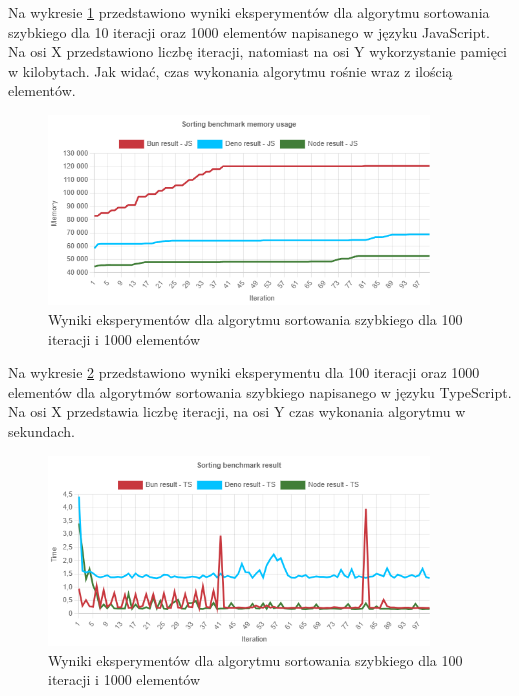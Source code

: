 Na wykresie \ref{fig:quick_sorting_e2_memory_js} przedstawiono wyniki eksperymentów dla algorytmu sortowania szybkiego dla 10 iteracji oraz 1000 elementów napisanego w języku JavaScript. Na osi X przedstawiono liczbę iteracji, natomiast na osi Y wykorzystanie pamięci w kilobytach. Jak widać, czas wykonania algorytmu rośnie wraz z ilością elementów.
\begin{figure}[H]
  \centering
  \includegraphics[width=0.9\textwidth]{Figures/sorting/quick/e2_memory_js.png}
  \caption{Wyniki eksperymentów dla algorytmu sortowania szybkiego dla 100 iteracji i 1000 elementów}
  \label{fig:quick_sorting_e2_memory_js}
\end{figure}

Na wykresie \ref{fig:quick_sorting_e2_ts} przedstawiono wyniki eksperymentu dla 100 iteracji oraz 1000 elementów dla algorytmów sortowania szybkiego napisanego w języku TypeScript. Na osi X przedstawia liczbę iteracji, na osi Y czas wykonania algorytmu w sekundach. 

\begin{figure}[H]
  \centering
  \includegraphics[width=0.9\textwidth]{Figures/sorting/quick/e2_ts.png}
  \caption{Wyniki eksperymentów dla algorytmu sortowania szybkiego dla 100 iteracji i 1000 elementów}
  \label{fig:quick_sorting_e2_ts}
\end{figure}

